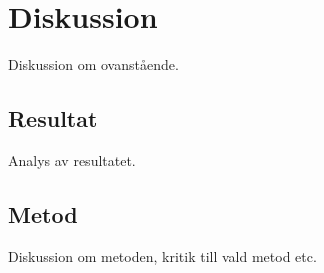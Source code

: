 \section{Diskussion}
\label{sec:bjorn-discussion}

Diskussion om ovanstående.

\subsection{Resultat}
\label{subsec:bjorn-discussion-results}

Analys av resultatet.

\subsection{Metod}
\label{subsec:bjorn-discussion-method}

Diskussion om metoden, kritik till vald metod etc.
